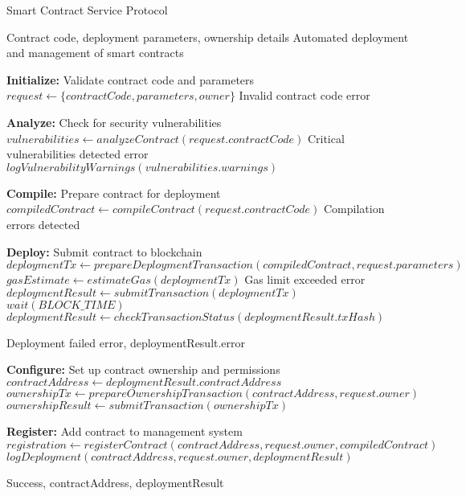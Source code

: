 
\begin{algorithm}
\caption{Smart Contract Service Protocol}
\label{alg:smart-contract}
\begin{algorithmic}[1]
\Require Contract code, deployment parameters, ownership details
\Ensure Automated deployment and management of smart contracts

\State \textbf{Initialize:} Validate contract code and parameters
\State $request \gets \{contractCode, parameters, owner\}$
    \State \Return Invalid contract code error
\EndIf

\State \textbf{Analyze:} Check for security vulnerabilities
\State $vulnerabilities \gets analyzeContract(request.contractCode)$
    \State \Return Critical vulnerabilities detected error
\EndIf
{}
    \State $logVulnerabilityWarnings(vulnerabilities.warnings)$
\EndIf

\State \textbf{Compile:} Prepare contract for deployment
\State $compiledContract \gets compileContract(request.contractCode)$
    \State \Return Compilation errors detected
\EndIf

\State \textbf{Deploy:} Submit contract to blockchain
\State $deploymentTx \gets prepareDeploymentTransaction(compiledContract, request.parameters)$
\State $gasEstimate \gets estimateGas(deploymentTx)$
    \State \Return Gas limit exceeded error
\EndIf
\State $deploymentResult \gets submitTransaction(deploymentTx)$
    \State $wait(BLOCK\_TIME)$
    \State $deploymentResult \gets checkTransactionStatus(deploymentResult.txHash)$
\EndWhile

    \State \Return Deployment failed error, deploymentResult.error
\EndIf

\State \textbf{Configure:} Set up contract ownership and permissions
\State $contractAddress \gets deploymentResult.contractAddress$
\State $ownershipTx \gets prepareOwnershipTransaction(contractAddress, request.owner)$
\State $ownershipResult \gets submitTransaction(ownershipTx)$

\State \textbf{Register:} Add contract to management system
\State $registration \gets registerContract(contractAddress, request.owner, compiledContract)$
\State $logDeployment(contractAddress, request.owner, deploymentResult)$

\State \Return Success, contractAddress, deploymentResult
\end{algorithmic}
\end{algorithm} 